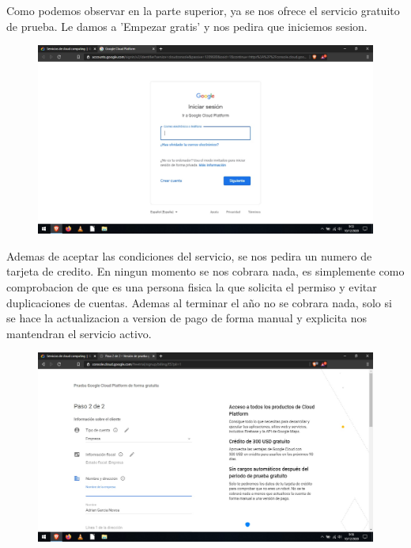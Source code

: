 \documentclass[a4paper,10pt]{article}
\begin{document}
Como podemos observar en la parte superior, ya se nos ofrece el servicio gratuito de prueba. Le damos a 'Empezar gratis' y nos pedira que iniciemos sesion.

\begin{figure}[H]
\begin{center}
\includegraphics[width=500pt]{./fotos/GoogleCloud/2 - GC.jpg}
\end{center}
\end{figure}

Ademas de aceptar las condiciones del servicio, se nos pedira un numero de tarjeta de credito. En ningun momento se nos cobrara nada, es simplemente como comprobacion de que es una persona fisica la que solicita el permiso y evitar duplicaciones de cuentas. Ademas al terminar el año no se cobrara nada, solo si se hace la actualizacion a version de pago de forma manual y explicita nos mantendran el servicio activo.

\begin{figure}[H]
\begin{center}
\includegraphics[width=500pt]{./fotos/GoogleCloud/4 - GC.jpg}
\end{center}
\end{figure}
\end{document}
